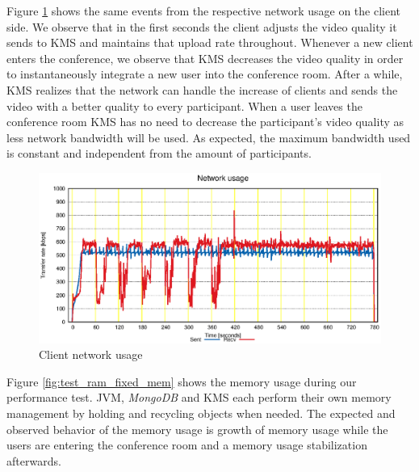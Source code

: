 \documentclass[10pt,conference]{IEEEtran}
\begin{document}


Figure \ref{fig:test_client_net} shows the same events from the respective network usage on the client side.
We observe that in the first seconds the client adjusts the video quality it sends to \gls{KMS} and maintains that upload rate throughout.
Whenever a new client enters the conference, we observe that \gls{KMS} decreases the video quality in order to instantaneously integrate a new user into the conference room.
After a while, \gls{KMS} realizes that the network can handle the increase of clients and sends the video with a better quality to every participant.
When a user leaves the conference room \gls{KMS} has no need to decrease the participant's video quality as less network bandwidth will be used.
As expected, the maximum bandwidth used is constant and independent from the amount of participants.

\begin{figure}
  \centering
  \includegraphics[width=\linewidth]{stats/test_client_net.eps}
  \caption{Client network usage}
  \label{fig:test_client_net}
\end{figure}

Figure \ref{fig:test_ram_fixed_mem} shows the memory usage during our performance test.
\gls{JVM}, \emph{MongoDB} and \gls{KMS} each perform their own memory management by holding and recycling objects when needed.
The expected and observed behavior of the memory usage is growth of memory usage while the users are entering the conference room and a memory usage stabilization afterwards.
\end{document}
